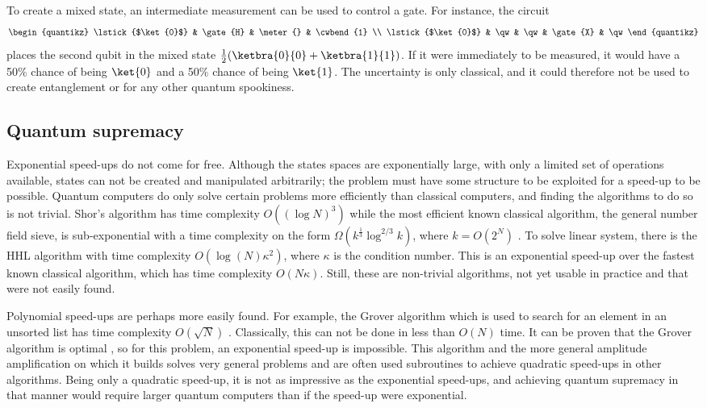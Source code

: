 To create a mixed state, an intermediate measurement can be used to control a gate.
For instance, the circuit
\begin{equation}
    \begin{quantikz}
        \lstick{$\ket{0}$} & \gate{H} & \meter{} & \cwbend{1} \\
        \lstick{$\ket{0}$} & \qw & \qw & \gate{X} & \qw
    \end{quantikz}
\end{equation}
places the second qubit in the mixed state $\frac{1}{2}(\ketbra{0}{0} + \ketbra{1}{1})$.
If it were immediately to be measured, it would have a 50\% chance of being $\ket{0}$ and a 50\% chance of being $\ket{1}$.
The uncertainty is only classical, and it could therefore not be used to create entanglement or for any other quantum spookiness.

\subsection{Quantum supremacy}
Exponential speed-ups do not come for free.
Although the states spaces are exponentially large, with only a limited set of operations available, states can not be created and manipulated arbitrarily; the problem must have some structure to be exploited for a speed-up to be possible.
Quantum computers do only solve certain problems more efficiently than classical computers, and finding the algorithms to do so is not trivial.
Shor's algorithm has time complexity $O((\log N)^3)$ while the most efficient known classical algorithm, the general number field sieve, is sub-exponential with a time complexity on the form $\Omega(k^{\frac{1}{3}}\log^{2/3}k)$, where $k=O(2^N)$ \autocite{dervovic2018}.
To solve linear system, there is the HHL algorithm with time complexity $O(\log(N)\kappa^2)$, where $\kappa$ is the condition number.
This is an exponential speed-up over the fastest known classical algorithm\footnotemark{}, which has time complexity $O(N \kappa)$.
Still, these are non-trivial algorithms, not yet usable in practice and that were not easily found.


Polynomial speed-ups are perhaps more easily found.
For example, the Grover algorithm which is used to search for an element in an unsorted list has time complexity $O(\sqrt{N})$ \autocite{grover1996}.
Classically, this can not be done in less than $O(N)$ time.
It can be proven that the Grover algorithm is optimal \autocite{zalka1999}, so for this problem, an exponential speed-up is impossible.
This algorithm and the more general amplitude amplification on which it builds solves very general problems and are often used subroutines to achieve quadratic speed-ups in other algorithms.
Being only a quadratic speed-up, it is not as impressive as the exponential speed-ups, and achieving quantum supremacy in that manner would require larger quantum computers than if the speed-up were exponential.

